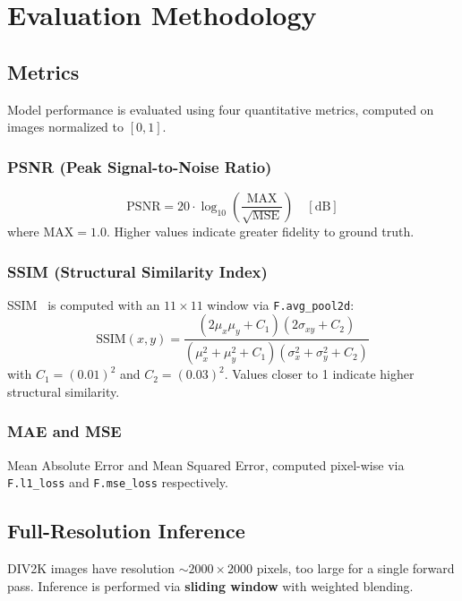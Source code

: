 \section{Evaluation Methodology}
\label{sec:evaluation}

\subsection{Metrics}

Model performance is evaluated using four quantitative metrics, computed on images normalized to $[0, 1]$.

\subsubsection{PSNR (Peak Signal-to-Noise Ratio)}
\begin{equation}
\text{PSNR} = 20 \cdot \log_{10}\!\left(\frac{\text{MAX}}{\sqrt{\text{MSE}}}\right) \quad [\text{dB}]
\end{equation}
where $\text{MAX} = 1.0$. Higher values indicate greater fidelity to ground truth.

\subsubsection{SSIM (Structural Similarity Index)}
SSIM~\cite{ssim} is computed with an $11\!\times\!11$ window via \texttt{F.avg\_pool2d}:
\begin{equation}
\text{SSIM}(x, y) = \frac{(2\mu_x\mu_y + C_1)(2\sigma_{xy} + C_2)}{(\mu_x^2 + \mu_y^2 + C_1)(\sigma_x^2 + \sigma_y^2 + C_2)}
\end{equation}
with $C_1 = (0.01)^2$ and $C_2 = (0.03)^2$. Values closer to 1 indicate higher structural similarity.

\subsubsection{MAE and MSE}
Mean Absolute Error and Mean Squared Error, computed pixel-wise via \texttt{F.l1\_loss} and \texttt{F.mse\_loss} respectively.

\subsection{Full-Resolution Inference}

DIV2K images have resolution ${\sim}2000\!\times\!2000$ pixels, too large for a single forward pass. Inference is performed via \textbf{sliding window} with weighted blending.

